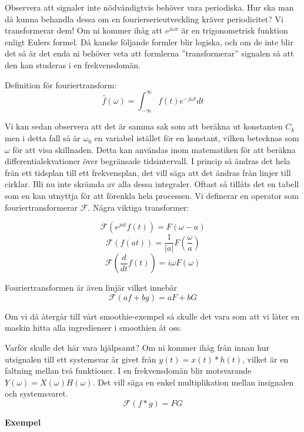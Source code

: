 \documentclass{article}
\begin{document}
Observera att signaler inte nödvändigtvis behöver vara periodiska. Hur ska man då kunna behandla dessa om en fourierserieutveckling kräver periodicitet? Vi transformerar dem! Om ni kommer ihåg att $e^{j\omega x}$ är en trigonometrisk funktion enligt Eulers formel. Då kanske följande formler blir logiska, och om de inte blir det så är det enda ni behöver veta att formlerna ''transformerar'' signalen så att den kan studeras i en frekvensdomän.

Definition för fouriertransform:
\[\hat{f}(\omega) = \int_{-\infty}^{\infty} f(t) e^{-j \omega t} dt\]

Vi kan sedan observera att det är samma sak som att beräkna ut konstanten $C_k$ men i detta fall så är $\omega_0$ en variabel istället för en konstant, vilken betecknas som $\omega$ för att visa skillnaden. 
Detta kan användas inom matematiken för att beräkna differentialekvationer över begränsade tidsintervall. I princip så ändras det hela från ett tidsplan till ett frekvensplan, det vill säga att det ändras från linjer till cirklar. %
Bli nu inte skrämda av alla dessa integraler. Oftast så tillåts det en tabell som en kan utnyttja för att förenkla hela processen. Vi definerar en operator som fouriertransformerar $\mathcal{F}$. Några viktiga transformer:

\[\mathcal{F}(e^{j a t} f(t)) = F(\omega - a)\]%
\[\mathcal{F}(f(at)) = \frac{1}{|a|}F(\frac{\omega}{a})\]%
\[\mathcal{F}(\frac{d}{dt} f(t)) = i\omega F(\omega) \]%

Fouriertransformen är även linjär vilket innebär
$$\mathcal{F}(a f + b g) = a F + b G$$

Om vi då återgår till vårt smoothie-exempel så skulle det vara som att vi låter en maskin hitta alla ingredienser i smoothien åt oss.

Varför skulle det här vara hjälpsamt? Om ni kommer ihåg från innan hur utsignalen till ett systemsvar är givet från $y(t) = x(t) * h(t)$, vilket är en faltning mellan två funktioner. I en frekvensdomän blir motsvarande $Y(\omega) = X(\omega) H(\omega)$. Det vill säga en enkel multiplikation mellan insignalen och systemsvaret.
\[\mathcal{F}(f*g) = F G \]

\textbf{Exempel} %
\end{document}
